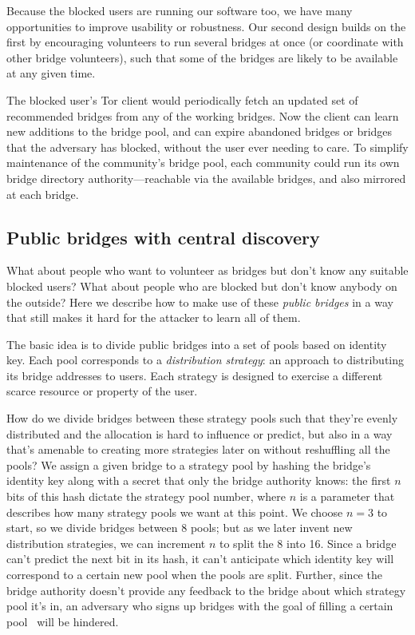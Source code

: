 \documentclass{llncs}
\begin{document}
Because the blocked users are running our software too, we have many
opportunities to improve usability or robustness. Our second design builds
on the first by encouraging volunteers to run several bridges at once
(or coordinate with other bridge volunteers), such that some
of the bridges are likely to be available at any given time.

The blocked user's Tor client would periodically fetch an updated set of
recommended bridges from any of the working bridges. Now the client can
learn new additions to the bridge pool, and can expire abandoned bridges
or bridges that the adversary has blocked, without the user ever needing
to care. To simplify maintenance of the community's bridge pool, each
community could run its own bridge directory authority---reachable via
the available bridges, and also mirrored at each bridge.

\subsection{Public bridges with central discovery}

What about people who want to volunteer as bridges but don't know any
suitable blocked users? What about people who are blocked but don't
know anybody on the outside? Here we describe how to make use of these
\emph{public bridges} in a way that still makes it hard for the attacker
to learn all of them.

The basic idea is to divide public bridges into a set of pools based on
identity key. Each pool corresponds to a \emph{distribution strategy}:
an approach to distributing its bridge addresses to users. Each strategy
is designed to exercise a different scarce resource or property of
the user.

How do we divide bridges between these strategy pools such that they're
evenly distributed and the allocation is hard to influence or predict,
but also in a way that's amenable to creating more strategies later
on without reshuffling all the pools? We assign a given bridge
to a strategy pool by hashing the bridge's identity key along with a
secret that only the bridge authority knows: the first $n$ bits of this
hash dictate the strategy pool number, where $n$ is a parameter that
describes how many strategy pools we want at this point. We choose $n=3$
to start, so we divide bridges between 8 pools; but as we later invent
new distribution strategies, we can increment $n$ to split the 8 into
16. Since a bridge can't predict the next bit in its hash, it can't
anticipate which identity key will correspond to a certain new pool
when the pools are split. Further, since the bridge authority doesn't
provide any feedback to the bridge about which strategy pool it's in,
an adversary who signs up bridges with the goal of filling a certain
pool~\cite{casc-rep} will be hindered.
\end{document}
